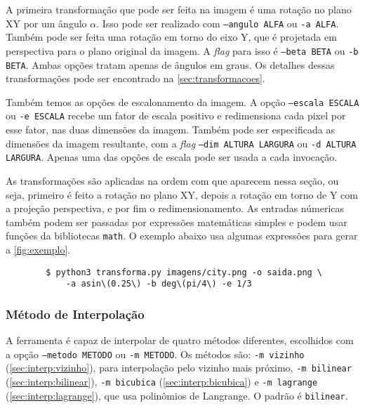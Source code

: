     A primeira transformação que pode ser feita na imagem é uma rotação no plano XY por um ângulo $\alpha$. Isso pode ser realizado com \texttt{--angulo ALFA} ou \texttt{-a ALFA}. Também pode ser feita uma rotação em torno do eixo Y, que é projetada em perspectiva para o plano original da imagem. A \textit{flag} para isso é \texttt{--beta BETA} ou \texttt{-b BETA}. Ambas opções tratam apenas de ângulos em graus. Os detalhes dessas transformações pode ser encontrado na \cref{sec:transformacoes}.


    Também temos as opções de escalonamento da imagem. A opção \texttt{--escala ESCALA} ou \texttt{-e ESCALA} recebe um fator de escala positivo e redimensiona cada pixel por esse fator, nas duas dimensões da imagem. Também pode ser especificada as dimensões da imagem resultante, com a \textit{flag} \texttt{--dim ALTURA LARGURA} ou \texttt{-d ALTURA LARGURA}. Apenas uma das opções de escala pode ser usada a cada invocação.

    As transformações são aplicadas na ordem com que aparecem nessa seção, ou seja, primeiro é feito a rotação no plano XY, depois a rotação em torno de Y com a projeção perspectiva, e por fim o redimensionamento. As entradas númericas também podem ser passadas por expressões matemáticas simples e podem usar funções da bibliotecas \texttt{math}. O exemplo abaixo usa algumas expressões para gerar a \cref{fig:exemplo}.

    \begin{verbatim}
        $ python3 transforma.py imagens/city.png -o saida.png \
            -a asin\(0.25\) -b deg\(pi/4\) -e 1/3
    \end{verbatim}

\subsubsection{Método de Interpolação}

    A ferramenta é capaz de interpolar de quatro métodos diferentes, escolhidos com a opção \texttt{--metodo METODO} ou \texttt{-m METODO}. Os métodos são: \texttt{-m vizinho} (\cref{sec:interp:vizinho}), para interpolação pelo vizinho mais próximo, \texttt{-m bilinear} (\ref{sec:interp:bilinear}), \texttt{-m bicubica} (\ref{sec:interp:bicubica}) e \texttt{-m lagrange} (\ref{sec:interp:lagrange}), que usa polinômios de Langrange. O padrão é \texttt{bilinear}.

